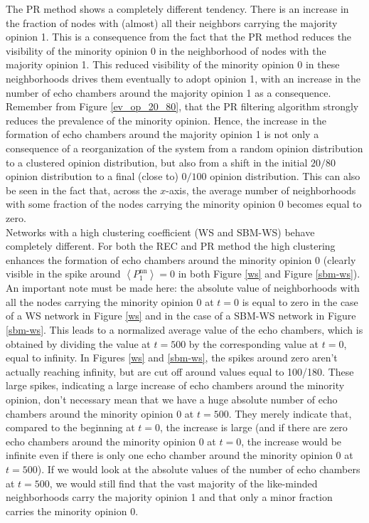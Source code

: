 \documentclass[11 pt , letterpaper , twoside , openright]{book}
\begin{document}
The PR method shows a completely different tendency. There is an increase in the fraction of nodes with (almost) all their neighbors carrying the majority opinion 1. This is a consequence from the fact that the PR method reduces the visibility of the minority opinion 0 in the neighborhood of nodes with the majority opinion 1. This reduced visibility of the minority opinion 0 in these neighborhoods drives them eventually to adopt opinion 1, with an increase in the number of echo chambers around the majority opinion 1 as a consequence. Remember from Figure \ref{ev_op_20_80}, that the PR filtering algorithm strongly reduces the prevalence of the minority opinion. Hence, the increase in the formation of echo chambers around the majority opinion 1 is not only a consequence of a reorganization of the system from a random opinion distribution to a clustered opinion distribution, but also from a shift in the initial $20/80$ opinion distribution to a final (close to) $0/100$ opinion distribution. This can also be seen in the fact that, across the $x$-axis, the average number of neighborhoods with some fraction of the nodes carrying the minority opinion 0 becomes equal to zero. \\
\newline
Networks with a high clustering coefficient (WS and SBM-WS) behave completely different. For both the REC and PR method the high clustering enhances the formation of echo chambers around the minority opinion 0 (clearly visible in the spike around $\left<P_1^{\text{nn}}\right> = 0$ in both Figure \ref{ws} and Figure \ref{sbm-ws}). An important note must be made here: the absolute value of neighborhoods with all the nodes carrying the minority opinion 0 at $t=0$ is equal to zero in the case of a WS network in Figure \ref{ws} and in the case of a SBM-WS network in Figure \ref{sbm-ws}. This leads to a normalized average value of the echo chambers, which is obtained by dividing the value at $t=500$ by the corresponding value at $t=0$, equal to infinity. In Figures \ref{ws} and \ref{sbm-ws}, the spikes around zero aren't actually reaching infinity, but are cut off around values equal to 100/180. These large spikes, indicating a large increase of echo chambers around the minority opinion, don't necessary mean that we have a huge absolute number of echo chambers around the minority opinion 0 at $t=500$. They merely indicate that, compared to the beginning at $t=0$, the increase is large (and if there are zero echo chambers around the minority opinion 0 at $t=0$, the increase would be infinite even if there is only one echo chamber around the minority opinion 0 at $t=500$). If we would look at the absolute values of the number of echo chambers at $t=500$, we would still find that the vast majority of the like-minded neighborhoods carry the majority opinion 1 and that only a minor fraction carries the minority opinion 0.\\
\end{document}
